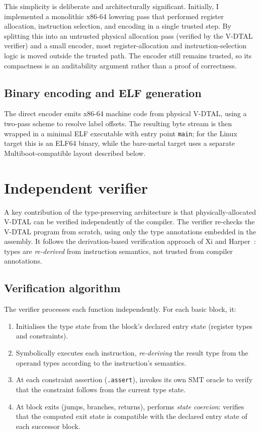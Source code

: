 This simplicity is deliberate and architecturally significant. Initially, I implemented a monolithic x86-64 lowering pass that performed register allocation, instruction selection, and encoding in a single trusted step. By splitting this into an untrusted physical allocation pass (verified by the V-DTAL verifier) and a small encoder, most register-allocation and instruction-selection logic is moved outside the trusted path. The encoder still remains trusted, so its compactness is an auditability argument rather than a proof of correctness.

\subsection{Binary encoding and ELF generation}

The direct encoder emits x86-64 machine code from physical V-DTAL, using a two-pass scheme to resolve label offsets. The resulting byte stream is then wrapped in a minimal ELF executable with entry point \texttt{main}; for the Linux target this is an ELF64 binary, while the bare-metal target uses a separate Multiboot-compatible layout described below.

\section{Independent verifier}\label{sec:verifier}

A key contribution of the type-preserving architecture is that physically-allocated V-DTAL can be verified independently of the compiler. The verifier re-checks the V-DTAL program from scratch, using only the type annotations embedded in the assembly. It follows the derivation-based verification approach of Xi and Harper~\cite{Xi2001DTAL}: types are \textit{re-derived} from instruction semantics, not trusted from compiler annotations.

\subsection{Verification algorithm}

The verifier processes each function independently. For each basic block, it:

\begin{enumerate}
  \item Initialises the type state from the block's declared entry state (register types and constraints).
  \item Symbolically executes each instruction, \textit{re-deriving} the result type from the operand types according to the instruction's semantics.
  \item At each constraint assertion (\texttt{.assert}), invokes its own SMT oracle to verify that the constraint follows from the current type state.
  \item At block exits (jumps, branches, returns), performs \textit{state coercion}: verifies that the computed exit state is compatible with the declared entry state of each successor block.
\end{enumerate}

